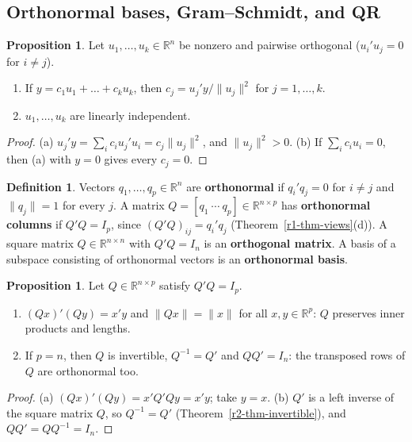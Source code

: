 \documentclass[12pt]{article}
\newcommand{\R}{\mathbb R}
\theoremstyle{definition}
\newtheorem{proposition}[theorem]{Proposition}
\newtheorem{definition}[theorem]{Definition}
\begin{document}
\subsection*{Orthonormal bases, Gram--Schmidt, and QR}

\begin{proposition}\label{r6-prop-orthogonal-list}
Let \(u_1,\dots,u_k\in\R^n\) be nonzero and pairwise orthogonal (\(u_i'u_j=0\) for \(i\ne j\)).
\begin{enumerate}
\item If \(y=c_1u_1+\dots+c_ku_k\), then \(c_j=u_j'y/\lVert u_j\rVert^2\) for \(j=1,\dots,k\).
\item \(u_1,\dots,u_k\) are linearly independent.
\end{enumerate}
\end{proposition}
\begin{proof}
(a) \(u_j'y=\sum_ic_iu_j'u_i=c_j\lVert u_j\rVert^2\), and \(\lVert u_j\rVert^2>0\). (b) If \(\sum_ic_iu_i=0\), then (a)
with \(y=0\) gives every \(c_j=0\).
\end{proof}

\begin{definition}\label{r6-def-orthonormal}
Vectors \(q_1,\dots,q_p\in\R^n\) are \textbf{orthonormal} if \(q_i'q_j=0\) for \(i\ne j\) and \(\lVert q_j\rVert=1\)
for every \(j\). A matrix \(Q=[q_1\ \cdots\ q_p]\in\R^{n\times p}\) has \textbf{orthonormal columns} if
\(Q'Q=I_p\), since \((Q'Q)_{ij}=q_i'q_j\) (Theorem~\ref{r1-thm-views}(d)). A square matrix \(Q\in\R^{n\times n}\) with
\(Q'Q=I_n\) is an \textbf{orthogonal matrix}. A basis of a subspace consisting of orthonormal vectors is
an \textbf{orthonormal basis}.
\end{definition}

\begin{proposition}\label{r6-prop-orthonormal}
Let \(Q\in\R^{n\times p}\) satisfy \(Q'Q=I_p\).
\begin{enumerate}
\item \((Qx)'(Qy)=x'y\) and \(\lVert Qx\rVert=\lVert x\rVert\) for all \(x,y\in\R^p\): \(Q\) preserves inner products and
lengths.
\item If \(p=n\), then \(Q\) is invertible, \(Q^{-1}=Q'\) and \(QQ'=I_n\): the transposed rows of \(Q\) are
orthonormal too.
\end{enumerate}
\end{proposition}
\begin{proof}
(a) \((Qx)'(Qy)=x'Q'Qy=x'y\); take \(y=x\). (b) \(Q'\) is a left inverse of the square matrix \(Q\), so
\(Q^{-1}=Q'\) (Theorem~\ref{r2-thm-invertible}), and \(QQ'=QQ^{-1}=I_n\).
\end{proof}
\end{document}
